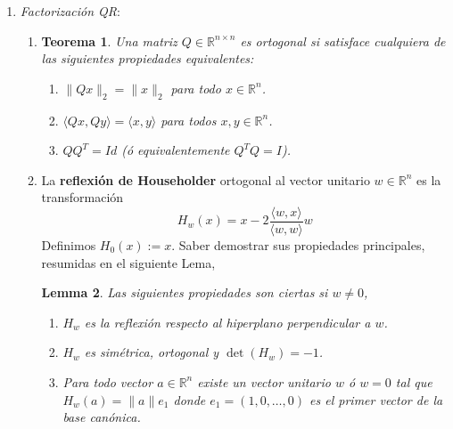 \documentclass[12pt]{amsart}
\newtheorem{lemma}{Lemma}[section]
\newtheorem{theorem}[lemma]{Teorema}
\theoremstyle{definition}
\newcommand{\RR}{\ensuremath{\mathbb{R}}}
\begin{document}
\begin{enumerate}
\begin{enumerate}
Más generalmente, si $\det(A_p)\neq 0$ para todo $p$ y $A$ es simétrica entonces existe una descomposición $A=LDL^T$ donde $L$ es triangular inferior con diagonal de unos y $D$ es una matriz diagonal.

\item Saber que, por Gauss-Jordan, TODA matriz admite una descomposición $LU$ con pivoteo $PA=LU$ para alguna permutación $P$. \emph{Dato curioso (sin dem.)} para TODA matriz simétrica $A$ existe una permutación $P$ tal que $P^T A P = LDL^T$ donde $L$ es triangular inferior con unos en la diagonal, $D$ es diagonal \emph{por bloques} donde todos los bloques tienen tamaño $2\times 2$ ó $1\times 1$). Ejemplo: $\begin{pmatrix}
0 & 1 \\
1 & 0
\end{pmatrix}$ necesita bloques $2\times 2$.
\end{enumerate}

\item {\it Factorización QR}:
\begin{enumerate}

\item \begin{theorem} Una matriz $Q\in \RR^{n\times n}$ es \emph{ortogonal} si satisface cualquiera de las siguientes propiedades equivalentes:
\begin{enumerate}
\item $\|Qx\|_2=\|x\|_2$ para todo $x\in \RR^n$.
\item $\langle Qx,Qy\rangle = \langle x,y\rangle $ para todos $x,y\in \RR^n$.
\item $QQ^T=Id$ (ó equivalentemente $Q^TQ=I$). 
\end{enumerate}
\end{theorem}

\item La {\bf reflexión de Householder} ortogonal al vector unitario $w\in \RR^n$ es la transformación
\[H_w(x)=x-2\frac{\langle w,x\rangle}{\langle w,w\rangle} w\]
Definimos $H_0(x):=x$. Saber demostrar sus propiedades principales, resumidas en el siguiente Lema,
\begin{lemma} Las siguientes propiedades son ciertas si $w\neq 0$,
\begin{enumerate}
\item $H_w$ es la reflexión respecto al hiperplano perpendicular a $w$.
\item $H_w$ es simétrica, ortogonal y $\det(H_w)=-1$.
\item Para todo vector $a\in \RR^n$ existe un vector unitario $w$ ó $w=0$ tal que $H_w(a)=\|a\|e_1$ donde $e_1=(1,0,\dots,0)$ es el primer vector de la base canónica.
\end{enumerate}
\end{lemma}



\end{enumerate}
\end{enumerate}
\end{document}
